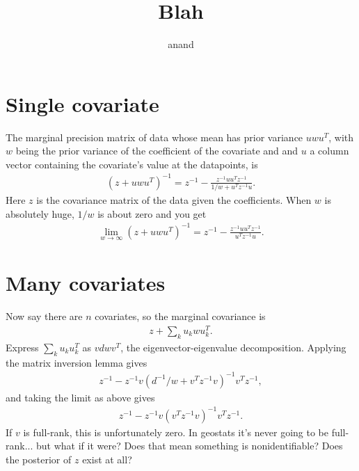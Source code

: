 \documentclass[a4paper]{article}
\begin{document}
\title{Blah}
\author{anand}
\maketitle

\section{Single covariate}

The marginal precision matrix of data whose mean has prior variance $uwu^T$, with $w$ being the prior variance of the coefficient of the covariate and and $u$ a column vector containing the covariate's value at the datapoints, is
\begin{eqnarray*}
(z+uwu^T)^{-1}=z^{-1}- \frac{z^{-1}uu^Tz^{-1}}{1/w+u^Tz^{-1}u}.
\end{eqnarray*}
Here $z$ is the covariance matrix of the data given the coefficients. When $w$ is absolutely huge, $1/w$ is about zero and you get 
\begin{eqnarray*}
\lim_{w\rightarrow\infty}(z+uwu^T)^{-1}=z^{-1}-\frac{z^{-1}uu^Tz^{-1}}{u^Tz^{-1}u}.
\end{eqnarray*}

\section{Many covariates}
\label{sec:many_covariates}

Now say there are $n$ covariates, so the marginal covariance is
\begin{eqnarray*}
    z+\sum_k u_k w u_k^T.
\end{eqnarray*}
Express $\sum_k u_k u_k^T$ as $v dw v^T$, the eigenvector-eigenvalue decomposition. Applying the matrix inversion lemma gives
\begin{eqnarray*}
    z^{-1}-z^{-1}v(d^{-1}/w +v^Tz^{-1}v)^{-1}v^Tz^{-1},
\end{eqnarray*}
and taking the limit as above gives
\begin{eqnarray*}
    z^{-1}-z^{-1}v(v^Tz^{-1}v)^{-1}v^Tz^{-1}.
\end{eqnarray*}
If $v$ is full-rank, this is unfortunately zero. In geostats it's never going to be full-rank... but what if it were? Does that mean something is nonidentifiable? Does the posterior of $z$ exist at all?
\end{document}
